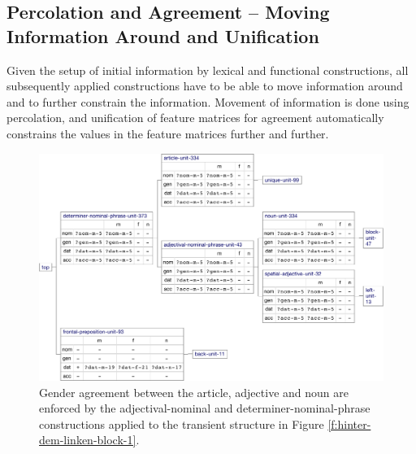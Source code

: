 \subsection*{Percolation and Agreement -- Moving Information Around and Unification}
Given the setup of initial information by lexical and functional
constructions, all subsequently applied constructions have to be able
to move information around and to further constrain the
information. Movement of information is done using percolation, and
unification of feature matrices for agreement automatically constrains
the values in the feature matrices further and further.

\begin{figure}[t]
  \centerline{\includegraphics[scale=0.5]{figs/hinter-dem-linken-block-2}}
  \caption[Gender agreement represented in the transient structure]{
  Gender agreement 
  between the article, adjective and noun
  are enforced by the adjectival-nominal and
  determiner-nominal-phrase constructions applied to the transient
  structure in Figure \ref{f:hinter-dem-linken-block-1}. }
  \label{f:hinter-dem-linken-block-2}
\end{figure}

